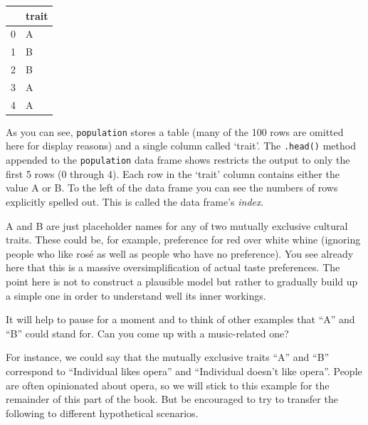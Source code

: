 \documentclass[
  a4paperpaper,
  ,captions=tableheading
]{scrbook}
\begin{document}
\begin{tabular}{ll}
\toprule
{} & trait \\
\midrule
0 &     A \\
1 &     B \\
2 &     B \\
3 &     A \\
4 &     A \\
\bottomrule
\end{tabular}

As you can see, \texttt{population} stores a table (many of the 100 rows
are omitted here for display reasons) and a single column called
`trait'. The \texttt{.head()} method appended to the \texttt{population}
data frame shows restricts the output to only the first 5 rows (0
through 4). Each row in the `trait' column contains either the value A
or B. To the left of the data frame you can see the numbers of rows
explicitly spelled out. This is called the data frame's \emph{index}.

\begin{tcolorbox}[enhanced jigsaw, arc=.35mm, colbacktitle=quarto-callout-note-color!10!white, colback=white, breakable, toprule=.15mm, title=\textcolor{quarto-callout-note-color}{\faInfo}\hspace{0.5em}{Note}, left=2mm, bottomtitle=1mm, toptitle=1mm, leftrule=.75mm, opacitybacktitle=0.6, titlerule=0mm, opacityback=0, rightrule=.15mm, bottomrule=.15mm, coltitle=black, colframe=quarto-callout-note-color-frame]

A and B are just placeholder names for any of two mutually exclusive
cultural traits. These could be, for example, preference for red over
white whine (ignoring people who like rosé as well as people who have no
preference). You see already here that this is a massive
oversimplification of actual taste preferences. The point here is not to
construct a plausible model but rather to gradually build up a simple
one in order to understand well its inner workings.

It will help to pause for a moment and to think of other examples that
``A'' and ``B'' could stand for. Can you come up with a music-related
one?

\end{tcolorbox}

For instance, we could say that the mutually exclusive traits ``A'' and
``B'' correspond to ``Individual likes opera'' and ``Individual doesn't
like opera''. People are often opinionated about opera, so we will stick
to this example for the remainder of this part of the book. But be
encouraged to try to transfer the following to different hypothetical
scenarios.
\end{document}
